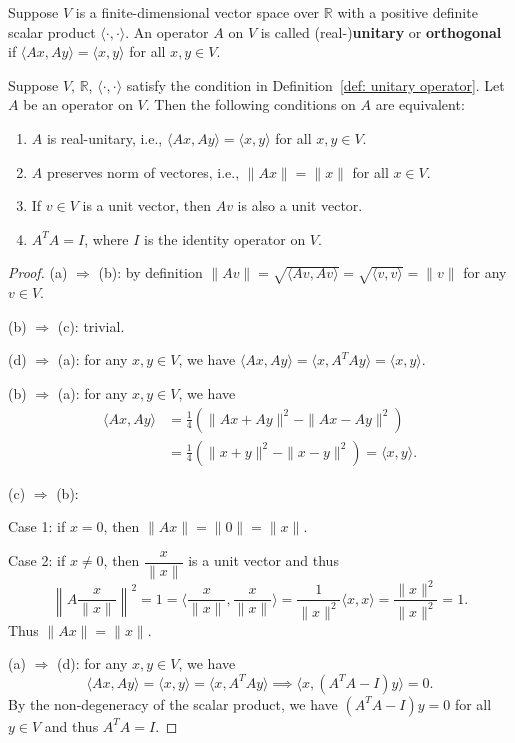 \documentclass{ctexart}
\newcommand{\R}{\mathbb{R}}
\begin{document}
    \begin{mydef}\label{def: unitary operator}
        Suppose $V$ is a finite-dimensional vector space over $\R$ with a positive definite scalar product $\langle \cdot, \cdot \rangle$. An operator $A$ on $V$ is called (real-)\textbf{unitary} or \textbf{orthogonal} if $\langle A x, A y \rangle = \langle x, y \rangle$ for all $x,y \in V$.
    \end{mydef}
    \begin{mythm}
        Suppose $V$, $\R$, $\langle \cdot, \cdot \rangle$ satisfy the condition in Definition~\ref{def: unitary operator}. Let $A$ be an operator on $V$. Then the following conditions on $A$ are equivalent:
        \begin{enumerate}[label=(\alph*)]
            \item $A$ is real-unitary, i.e., $\langle A x, A y \rangle = \langle x, y \rangle$ for all $x,y \in V$.
            \item $A$ preserves norm of vectores, i.e., $\|A x\| = \|x\|$ for all $x \in V$.
            \item If $v\in V$ is a unit vector, then $A v$ is also a unit vector.
            \item $A^T A = I$, where $I$ is the identity operator on $V$.
        \end{enumerate}
    \end{mythm}
    \begin{proof}
        (a) $\Rightarrow$ (b): by definition $\| Av \| = \sqrt{\langle Av, Av \rangle} = \sqrt{\langle v, v \rangle} = \|v\|$ for any $v\in V$.

        (b) $\Rightarrow$ (c): trivial.

        (d) $\Rightarrow$ (a): for any $x,y \in V$, we have $\langle A x, A y \rangle = \langle x, A^T A y \rangle = \langle x, y \rangle$.

        (b) $\Rightarrow$ (a): for any $x,y \in V$, we have
        \[
        \begin{aligned}
            \langle A x, A y \rangle &= \frac14 \left( \|A x + A y\|^2 - \|A x - A y\|^2 \right)\\  &= \frac{1}{4} \left( \|x + y\|^2 - \|x - y\|^2 \right) = \langle x, y \rangle.
        \end{aligned}
        \]

        (c) $\Rightarrow$ (b): 
        
        Case 1: if $x=0$, then $\|A x\| = \|0\| = \|x\|$. 
        
        Case 2: if $x\neq 0$, then $\dfrac{x}{\|x\|}$ is a unit vector and thus
        $$ \left\| A\frac{x}{\|x\|}\right\| ^2 = 1 = \langle \frac{x}{\|x\|}, \frac{x}{\|x\|} \rangle = \frac1{\|x\|^2} \langle x, x \rangle = \frac{\|x\|^2}{\|x\|^2} = 1. $$
        Thus $\|A x\| = \|x\|$.

        (a) $\Rightarrow$ (d): for any $x,y \in V$, we have
        $$ \langle Ax, A y \rangle = \langle x,y \rangle = \langle x, A^T A y \rangle \implies \langle x, (A^T A - I) y \rangle = 0. $$
        By the non-degeneracy of the scalar product, we have $(A^T A - I) y = 0$ for all $y\in V$ and thus $A^T A = I$.
    \end{proof}
\end{document}
